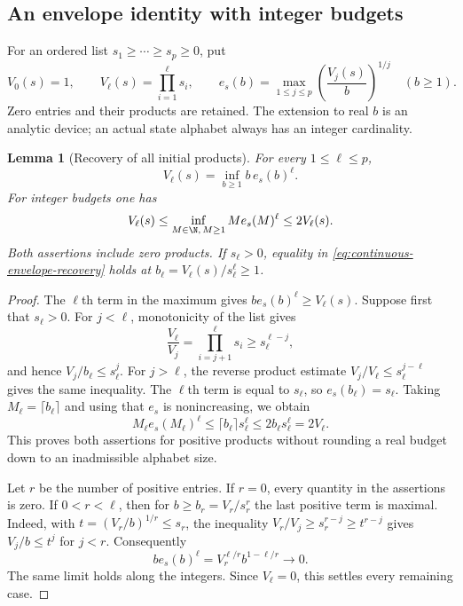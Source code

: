 \documentclass[11pt]{amsart}
\newtheorem{lemma}[theorem]{Lemma}
\theoremstyle{definition}\newtheorem{definition}[theorem]{Definition}
\theoremstyle{remark}\newtheorem{remark}[theorem]{Remark}
\begin{document}
\subsection{An envelope identity with integer budgets}
For an ordered list $s_1\ge\cdots\ge s_p\ge0$, put
\[
 V_0(s)=1,\qquad V_\ell(s)=\prod_{i=1}^{\ell}s_i,
 \qquad
 e_s(b)=\max_{1\le j\le p}\left(\frac{V_j(s)}b\right)^{1/j}
 \quad(b\ge1).
\]
Zero entries and their products are retained. The extension to real
$b$ is an analytic device; an actual state alphabet always has an
integer cardinality.

\begin{lemma}[Recovery of all initial products]
\label{lem:integer-envelope-duality}
For every $1\le\ell\le p$,
\begin{equation}\label{eq:continuous-envelope-recovery}
 V_\ell(s)=\inf_{b\ge1}b\,e_s(b)^\ell.
\end{equation}
For integer budgets one has
\begin{equation}\label{eq:integer-envelope-recovery}
 V_\ell(s)\le
 \inf_{M\in\N,\,M\ge1}M e_s(M)^\ell
 \le2V_\ell(s).
\end{equation}
Both assertions include zero products. If $s_\ell>0$, equality in
\eqref{eq:continuous-envelope-recovery} holds at
$b_\ell=V_\ell(s)/s_\ell^\ell\ge1$.
\end{lemma}
\begin{proof}
The $\ell$th term in the maximum gives
$b e_s(b)^\ell\ge V_\ell(s)$. Suppose first that $s_\ell>0$.
For $j<\ell$, monotonicity of the list gives
\[
 \frac{V_\ell}{V_j}=\prod_{i=j+1}^{\ell}s_i
       \ge s_\ell^{\ell-j},
\]
and hence $V_j/b_\ell\le s_\ell^j$. For $j>\ell$, the reverse
product estimate $V_j/V_\ell\le s_\ell^{j-\ell}$ gives the same
inequality. The $\ell$th term is equal to $s_\ell$, so
$e_s(b_\ell)=s_\ell$. Taking $M_\ell=\lceil b_\ell\rceil$ and
using that $e_s$ is nonincreasing, we obtain
\[
 M_\ell e_s(M_\ell)^\ell
 \le\lceil b_\ell\rceil s_\ell^\ell
 \le2b_\ell s_\ell^\ell=2V_\ell.
\]
This proves both assertions for positive products without rounding a
real budget down to an inadmissible alphabet size.

Let $r$ be the number of positive entries. If $r=0$, every quantity
in the assertions is zero. If $0<r<\ell$, then for
$b\ge b_r=V_r/s_r^r$ the last positive term is maximal. Indeed,
with $t=(V_r/b)^{1/r}\le s_r$, the inequality
$V_r/V_j\ge s_r^{r-j}\ge t^{r-j}$ gives $V_j/b\le t^j$ for
$j<r$. Consequently
\[
 b e_s(b)^\ell=V_r^{\ell/r}b^{1-\ell/r}\longrightarrow0.
\]
The same limit holds along the integers. Since $V_\ell=0$, this
settles every remaining case.
\end{proof}
\end{document}
